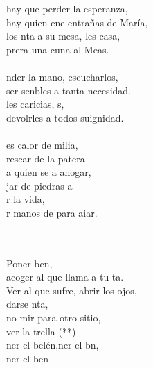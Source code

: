 \begin{cancion}
	 hay que perder la esperanza,\\
	hay quien ene entrañas de María,\\
	los nta a su mesa, les casa,\\
	prera una cuna al Meas. \\
\jump\\
	nder la mano, escucharlos,\\
	ser senbles a tanta necesidad.\\
	les caricias, s,\\
	devolrles a todos suignidad.\\
\jump\\
	es calor de milia,\\
	rescar de la patera \\
	a quien se  a ahogar,\\
	jar de  piedras a\\
	r la vida,\\
	r manos de  para aiar.\\\jump\\
	\begin{chorus}%
	     \\
	Poner ben, \\
	acoger al que llama a tu ta.\\
Ver al que sufre, abrir los ojos,\\
	darse nta,\\
	no mir para otro sitio, \\
	ver la trella (**)\\
	ner el belén,ner el bn,\\
	ner el ben   \\
	\end{chorus}%
	\jump\\
\end{cancion}%
